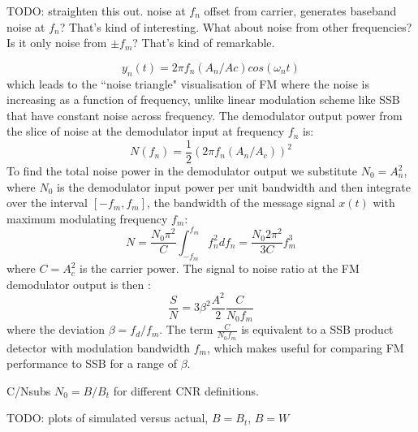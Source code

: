 \documentclass{article}
\begin{document}
TODO: straighten this out. noise at $f_n$ offset from carrier, generates baseband noise at $f_n$?  That's kind of interesting.  What about noise from other frequencies? Is it only noise from $\pm f_m$?  That's kind of remarkable.

\begin{equation}
y_n(t) = 2 \pi f_n (A_n/Ac) cos(\omega_n t)
\end{equation}
which leads to the ``noise triangle" visualisation of FM where the noise is increasing as a function of frequency, unlike linear modulation scheme like SSB that have constant noise across frequency. The demodulator output power from the slice of noise at the demodulator input at frequency $f_n$ is:
\begin{equation}
N(f_n) =  \frac{1}{2}(2 \pi f_n (A_n/A_c) )^2 
\end{equation}
To find the total noise power in the demodulator output we substitute $N_0=A_n^2$, where $N_0$ is the demodulator input power per unit bandwidth and then integrate over the interval $[-f_m,f_m]$, the bandwidth of the message signal $x(t)$ with maximum modulating frequency $f_m$:
\begin{equation}
N = \frac{N_0 \pi^2}{C} \int_{-f_m}^{f_m} f_n^2 df_n = \frac{N_0 2\pi^2}{3C} f_m^3
\end{equation}
where $C=A_c^2$ is the carrier power.  The signal to noise ratio at the FM demodulator output is then \cite{crilly2009communication}:
\begin{equation}
\label{eq_snr}
\frac{S}{N} = 3 \beta^2 \frac{A^2}{2} \frac{C}{N_0 f_m}
\end{equation}
where the deviation $\beta=f_d/f_m$. The term $\frac{C}{N_0 f_m}$ is equivalent to a SSB product detector with modulation bandwidth $f_m$, which makes  useful for comparing FM performance to SSB for a range of $\beta$.  

 C/Nsubs $N_0=B/B_t$ for different CNR definitions. 

TODO: plots of simulated versus actual, $B=B_t$, $B=W$



\end{document}
